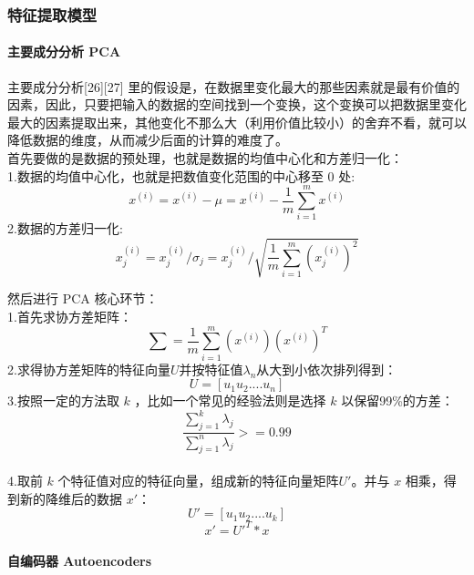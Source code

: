 \subsubsection{特征提取模型}\label{ux7279ux5f81ux63d0ux53d6ux6a21ux578b}

\paragraph{主要成分分析
PCA}\label{ux4e3bux8981ux6210ux5206ux5206ux6790-pca}

主要成分分析{[}26{]}{[}27{]}
里的假设是，在数据里变化最大的那些因素就是最有价值的因素，因此，只要把输入的数据的空间找到一个变换，这个变换可以把数据里变化最大的因素提取出来，其他变化不那么大（利用价值比较小）的舍弃不看，就可以降低数据的维度，从而减少后面的计算的难度了。\\首先要做的是数据的预处理，也就是数据的均值中心化和方差归一化：\\1.数据的均值中心化，也就是把数值变化范围的中心移至
0
处:\\\[ x^{(i)} = x^{(i)} - \mu = x^{(i)} - \frac{1}{m} \sum_{i=1}^m {x^{(i)}}\]
2.数据的方差归一化:\\\[ x_j^{(i)} = x_j^{(i)} / \sigma_j = x_j^{(i)} / \sqrt{\frac{1}{m} \sum_{i=1}^m {(x_{j}^{(i)})^2}} \]

然后进行 PCA 核心环节：\\1.首先求协方差矩阵：
\[\sum = \frac{1}{m} \sum_{i=1}^{m}(x^{(i)})(x^{(i)})^T\]
2.求得协方差矩阵的特征向量\(U\)并按特征值\(\lambda_n\)从大到小依次排列得到：\\\[U=[u_1 u_2 .... u_n]\]
3.按照一定的方法取 \(k\) ，比如一个常见的经验法则是选择 \(k\)
以保留99\%的方差：
\[\frac{\sum^{k}_{j=1}\lambda_j}{\sum^{n}_{j=1}\lambda_j} >= 0.99\]\\4.取前
\(k\) 个特征值对应的特征向量，组成新的特征向量矩阵\(U'\)。并与 \(x\)
相乘，得到新的降维后的数据 \(x'\)：\\\[U' = [u_1 u_2 .... u_k]\]
\[x' = U'^T * x\]

\paragraph{自编码器
Autoencoders}\label{ux81eaux7f16ux7801ux5668-autoencoders}


